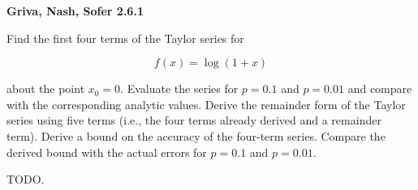 \textbf{Griva, Nash, Sofer 2.6.1}

Find the first four terms of the Taylor series for 

$$
  f(x) = \log{(1 + x)}
$$

about the point $x_0 = 0$. Evaluate the series for $p = 0.1$ and $p = 0.01$ and compare 
with the corresponding analytic values. Derive the remainder form of the Taylor series 
using five terms (i.e., the four terms already derived and a remainder term). Derive
a bound on the accuracy of the four-term series. Compare the derived bound with the
actual errors for $p = 0.1$ and $p = 0.01$.

\begin{solution}
  TODO.
  \ \\
\end{solution}